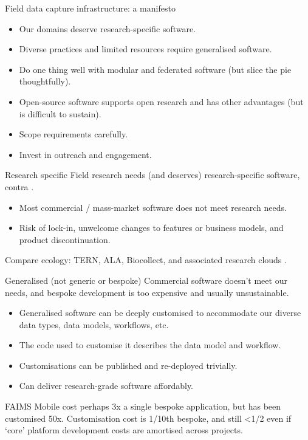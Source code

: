 \documentclass[aspectratio=169, 12pt]{beamer} %
\begin{document}
\begin{frame}{Field data capture infrastructure: a manifesto}
    \begin{itemize}[label=\textbullet]
        \item Our domains deserve research-specific software.
        \item Diverse practices and limited resources require generalised software.
        \item Do one thing well with modular and federated software (but slice the pie thoughtfully).
        \item Open-source software supports open research and has other advantages (but is difficult to sustain). 
        \item Scope requirements carefully.
        \item Invest in outreach and engagement.
    \end{itemize}
\end{frame}

\begin{frame}{Research specific}
    Field research needs (and deserves) research-specific software, contra \cite{Roosevelt2015-kd}.
      \begin{itemize}[label=\textbullet]
        \item Most commercial / mass-market software does not meet research needs.
        \item Risk of lock-in, unwelcome changes to features or business models, and product discontinuation.
    \end{itemize}
    Compare ecology: TERN, ALA, Biocollect, and associated research clouds \cite{Tern2019-sp, Ala2019-by, Ala2019-cb}.
\end{frame}

\begin{frame}{Generalised (not generic or bespoke)}
  Commercial software doesn't meet our needs, and bespoke development is too expensive and usually unsustainable.
      \begin{itemize}[label=\textbullet]
        \item Generalised software can be deeply customised to accommodate our diverse data types, data models, workflows, etc.
        \item The code used to customise it describes the data model and workflow.
        \item Customisations can be published and re-deployed trivially.
        \item Can deliver research-grade software affordably.  
    \end{itemize}
    FAIMS Mobile cost perhaps 3x a single bespoke application, but has been customised 50x. Customisation cost is 1/10th bespoke, and still <1/2 even if `core' platform development costs are amortised across projects.
\end{frame}
\end{document}
